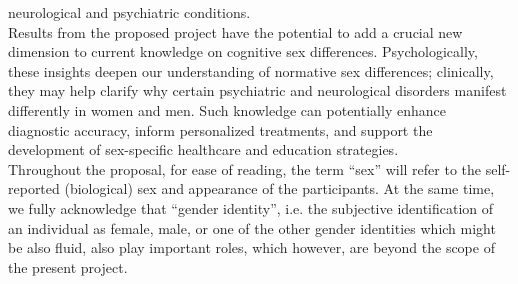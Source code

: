 \documentclass[11pt,a4paper]{article}
\begin{document}
neurological and psychiatric conditions.\\
Results from the proposed project have the potential to add a crucial new dimension to current knowledge on 
cognitive sex differences. Psychologically, these insights deepen our understanding of normative sex differences; 
clinically, they may help clarify why certain psychiatric and neurological disorders manifest differently in women 
and men. Such knowledge can potentially enhance diagnostic accuracy, inform personalized treatments, and support the 
development of sex-specific healthcare and education strategies.\\
Throughout the proposal, for ease of reading, the term “sex” will refer to the self-reported (biological) sex and 
appearance of the participants. At the same time, we fully acknowledge that “gender identity”, i.e. the 
subjective identification of an individual as female, male, or one of the other gender identities which might 
be also fluid, also play important roles, which however, are beyond the scope of the present project. 


\printbibliography
\end{document}
